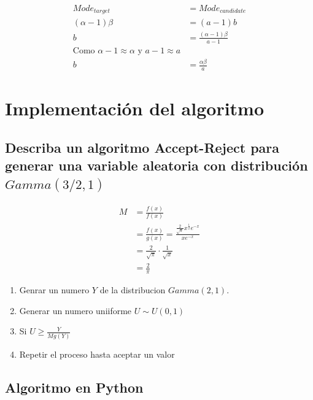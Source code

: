 \documentclass{article}
\begin{document}
\[
	\begin{split}
		Mode_{target}     & = Mode_{candidate}                    \\
		(\alpha - 1)\beta & = (a - 1)b                            \\
		b                 & = \frac{(\alpha - 1)\beta}{a-1}       \\
		\text{Como $\alpha -1 \approx \alpha $ y $a-1 \approx a$} \\
		b                 & = \frac{\alpha \beta}{a}
	\end{split}
\]

\section{Implementación del algoritmo}

\subsection{Describa un algoritmo \textbf{Accept-Reject} para generar una variable aleatoria con distribución $Gamma(3/2,1)$}

\[
	\begin{split}
		M & = \frac{f(x)}{f(x)}                                                                \\
		  & = \frac{f(x)}{g(x)} = \frac{\frac{2}{\sqrt{\pi}} x^{\frac{1}{2}} e^{-x}}{x e^{-x}} \\
		  & = \frac{2}{\sqrt{\pi}} \cdot \frac{1}{\sqrt{x}}                                    \\
		  & = \frac{2}{\pi}
	\end{split}
\]


\begin{enumerate}
	\item Genrar un numero $Y$ de la distribucion $Gamma(2,1)$.
	\item Generar un numero uniiforme $U \sim U(0,1)$
	\item Si $U \ge \frac{Y}{M g(Y)}$
	\item Repetir el proceso hasta aceptar un valor
\end{enumerate}


\subsection{Algoritmo en Python}
\begin{pythonbox}
	\inputminted{python}{code/accept.py}
\end{pythonbox}
\end{document}
